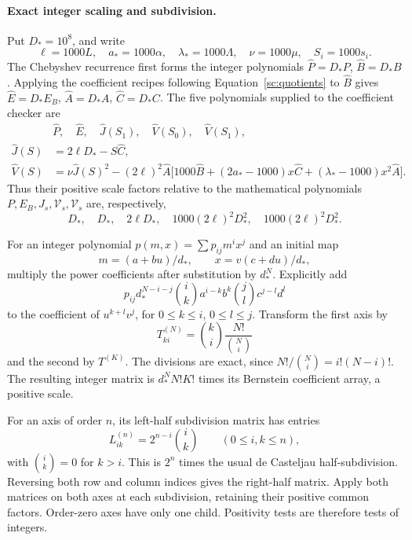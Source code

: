 \paragraph{Exact integer scaling and subdivision.}
Put $D_*=10^8$, and write
\[
 \ell=1000L,\quad a_*=1000\alpha,\quad
 \lambda_*=1000\Lambda,\quad \nu=1000\mu,\quad S_i=1000s_i.
\]
The Chebyshev recurrence first forms the integer polynomials
$\widehat P=D_*P$, $\widehat B=D_*B$.
Applying the coefficient recipes following Equation~\eqref{sc:quotients} to $\widehat B$
gives $\widehat E=D_*E_B$, $\widehat A=D_*A$, $\widehat C=D_*C$.
The five polynomials supplied to the coefficient checker are
\begin{align*}
 &\widehat P,\quad\widehat E,\quad\widehat J(S_1),
       \quad\widehat V(S_0),\quad\widehat V(S_1),\\
 \widehat J(S)&=2\ell D_*-S\widehat C,\\
 \widehat V(S)&=\nu\widehat J(S)^2-(2\ell)^2\widehat A
       \bigl[1000\widehat B+(2a_*-1000)x\widehat C
                   +(\lambda_*-1000)x^2\widehat A\bigr].
\end{align*}
Thus their positive scale factors relative to the mathematical
polynomials $P,E_B,J_s,\mathcal V_s,\mathcal V_s$ are, respectively,
\begin{equation}\label{sc:scalings}
 D_*,\quad D_*,\quad 2\ell D_*,\quad
 1000(2\ell)^2D_*^2,\quad1000(2\ell)^2D_*^2.
\end{equation}

For an integer polynomial $p(m,x)=\sum p_{ij}m^ix^j$ and an initial map
\[
 m=(a+bu)/d_*,\qquad x=v(c+du)/d_*,
\]
multiply the power coefficients after substitution by $d_*^N$.
Explicitly add
\[
 p_{ij}d_*^{N-i-j}\binom{i}{k}a^{i-k}b^k
                         \binom{j}{l}c^{j-l}d^l
\]
to the coefficient of $u^{k+l}v^j$, for $0\leq k\leq i$,
$0\leq l\leq j$.  Transform the first axis by
\[
 T^{(N)}_{ki}=\binom{k}{i}\frac{N!}{\binom Ni}
\]
and the second by $T^{(K)}$.  The divisions are exact, since
$N!/\binom Ni=i!(N-i)!$.  The resulting integer matrix is
$d_*^NN!K!$ times its Bernstein coefficient array, a positive scale.

For an axis of order $n$, its left-half subdivision matrix has entries
\[
 L^{(n)}_{ik}=2^{n-i}\binom{i}{k}\qquad(0\leq i,k\leq n),
\]
with $\binom{i}{k}=0$ for $k>i$.  This is $2^n$ times the usual
de Casteljau half-subdivision.  Reversing both row and column indices
gives the right-half matrix.  Apply both matrices on both axes at each
subdivision, retaining their positive common factors.  Order-zero axes
have only one child.  Positivity tests are therefore tests of integers.

